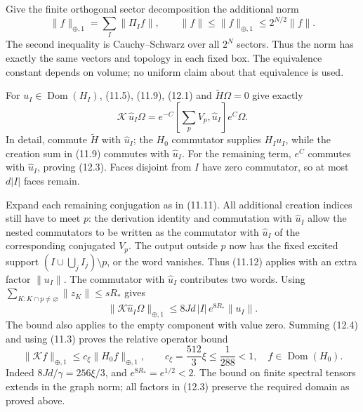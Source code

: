 \documentclass[
]{article}
\begin{document}
Give the finite orthogonal sector decomposition the additional norm \[
\|f\|_{\oplus,1}=\sum_I\|\Pi_If\|,\qquad
\|f\|\le\|f\|_{\oplus,1}\le2^{N/2}\|f\|.                     \tag{12.2}
\] The second inequality is Cauchy--Schwarz over all \(2^N\) sectors.
Thus the norm has exactly the same vectors and topology in each fixed
box. The equivalence constant depends on volume; no uniform claim about
that equivalence is used.

For \(u_I\in\operatorname{Dom}(H_I)\), (11.5), (11.9), (12.1) and
\(\widetilde H\Omega=0\) give exactly \[
\mathcal K\,\widehat u_I\Omega
=e^{-C}\left[\sum_pV_p,\widehat u_I\right]e^C\Omega .
                                                               \tag{12.3}
\] In detail, commute \(\widetilde H\) with \(\widehat u_I\); the
\(H_0\) commutator supplies \(H_Iu_I\), while the creation sum in (11.9)
commutes with \(\widehat u_I\). For the remaining term, \(e^C\) commutes
with \(\widehat u_I\), proving (12.3). Faces disjoint from \(I\) have
zero commutator, so at most \(d|I|\) faces remain.

Expand each remaining conjugation as in (11.11). All additional creation
indices still have to meet \(p\): the derivation identity and
commutation with \(\widehat u_I\) allow the nested commutators to be
written as the commutator with \(\widehat u_I\) of the corresponding
conjugated \(V_p\). The output outside \(p\) now has the fixed excited
support \((I\cup\bigcup_jI_j)\setminus p\), or the word vanishes. Thus
(11.12) applies with an extra factor \(\|u_I\|\). The commutator with
\(\widehat u_I\) contributes two words. Using
\(\sum_{K:K\cap p\ne\varnothing}\|z_K\|\le sR_*\) gives \[
\|\mathcal K\widehat u_I\Omega\|_{\oplus,1}
\le 8Jd\,|I|\,e^{8R_*}\|u_I\|.
                                                               \tag{12.4}
\] The bound also applies to the empty component with value zero.
Summing (12.4) and using (11.3) proves the relative operator bound \[
\|\mathcal Kf\|_{\oplus,1}
\le c_\xi\|H_0f\|_{\oplus,1},\qquad
c_\xi=\frac{512}{3}\xi\le\frac1{288}<1,
       \quad f\in\operatorname{Dom}(H_0).                    \tag{12.5}
\] Indeed \(8Jd/\gamma=256\xi/3\), and \(e^{8R_*}=e^{1/2}<2\). The bound
on finite spectral tensors extends in the graph norm; all factors in
(12.3) preserve the required domain as proved above.
\end{document}
